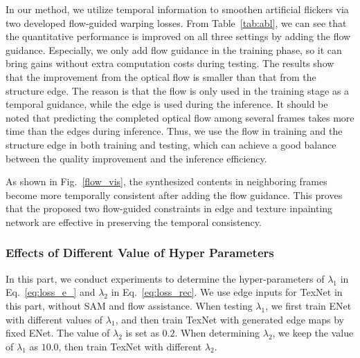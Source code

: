 In our method, we utilize temporal information to smoothen artificial flickers via two developed flow-guided warping losses. 
From Table~\ref{tab:abl}, we can see that the quantitative performance is improved on all three settings by adding the flow guidance. Especially, we only add flow guidance in the training phase, so it can bring gains without extra computation costs during testing.
The results show that the improvement from the optical flow is smaller than that from the structure edge.
The reason is that the flow is only used in the training stage as a temporal guidance, while the edge is used during the inference.
It should be noted that predicting the completed optical flow among several frames takes more time than the edges during inference.
Thus, we use the flow in training and the structure edge in both training and testing, which can achieve a good balance between the quality improvement and the inference efficiency. 


As shown in Fig.~\ref{flow_vis}, the synthesized contents in neighboring frames become more temporally consistent after adding the flow guidance.
This proves that the proposed two flow-guided constraints in edge and texture inpainting network are effective in preserving the temporal consistency.


 


\subsubsection{Effects of Different Value of Hyper Parameters}
In this part, we conduct experiments to determine the hyper-parameters of $\lambda_1$ in Eq.~\eqref{eq:loss_e_} and $\lambda_2$ in Eq.~\eqref{eq:loss_rec}. We use edge inputs for TexNet in this part, without SAM and flow assistance.
When testing $\lambda_1$, we first train ENet with different values of $\lambda_1$, and then train TexNet with generated edge maps by fixed ENet. The value of $\lambda_2$ is set as $0.2$. 
When determining $\lambda_2$, we keep the value of $\lambda_1$ as $10.0$, then train TexNet with different $\lambda_2$.

